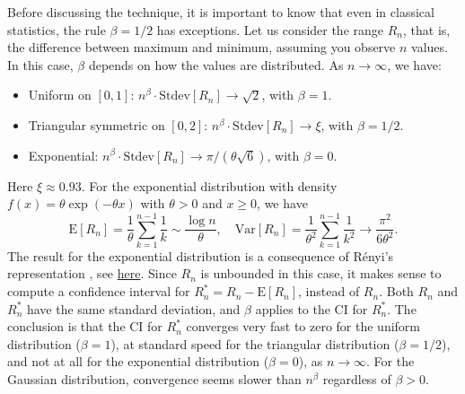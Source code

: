 \documentclass[oneside,10pt]{book}
\begin{document}
Before discussing the technique, it is important to know that even in classical statistics, the rule $\beta=1/2$ has exceptions. 
Let us consider the range $R_n$, that is, the difference between maximum and
 minimum, assuming you observe $n$ values. In this case, $\beta$ depends on how the values are distributed. As 
$n\rightarrow \infty$, we have: \vspace{1ex}
\begin{itemize}
\item Uniform on $[0, 1]$: $n^\beta \cdot \text{Stdev}[R_n] \rightarrow \sqrt{2}$, with $\beta = 1$.
\item Triangular symmetric on $[0, 2]$: $n^\beta\cdot\text{Stdev}[R_n] \rightarrow \xi$, with $\beta = 1/2$.
\item Exponential: $n^\beta\cdot\text{Stdev}[R_n]\rightarrow \pi/(\theta\sqrt{6})$, with $\beta = 0$.
\end{itemize}\vspace{1ex}
Here $\xi\approx 0.93$. For the exponential distribution with density $f(x) = \theta \exp(-\theta x)$ with $\theta>0$ and $x\geq 0$, we have 
$$ \text{E}[R_n] =  \frac{1}{\theta}\sum_{k=1}^{n-1}\frac{1}{k} \sim \frac{\log n}{\theta}, 
 \quad \text{Var}[R_n] = \frac{1}{\theta^2}\sum_{k=1}^{n-1}\frac{1}{k^2} \rightarrow \frac{\pi^2}{6\theta^2}.
$$
The result for the exponential distribution is a consequence of 
\textcolor{index}{Rényi's representation} \cite{renini53}, see \href{https://math.stackexchange.com/questions/3231505/variance-of-the-range-for-the-exponential-distribution}{here}.
Since $R_n$ is unbounded in this case, it makes sense
 to compute a confidence interval for $R^*_n = R_n - \text{E}[R_n]$, instead of $R_n$. Both $R_n$ and $R^*_n$ have the same standard deviation, and $\beta$ 
applies to the CI for $R^*_n$. The conclusion is that the CI for $R^*_n$ converges very fast to zero for the uniform distribution ($\beta=1$), at standard speed for the triangular distribution ($\beta=1/2$), and not at all for the exponential distribution ($\beta=0$), as $n\rightarrow\infty$. For the Gaussian distribution, convergence seems slower than $n^\beta$ regardless of $\beta>0$.
\end{document}
